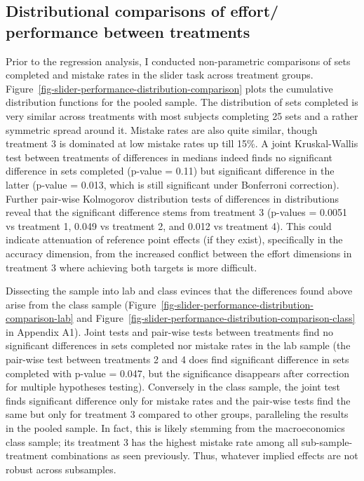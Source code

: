 \documentclass[
  12,
  letterpaper,
  DIV=11,
  numbers=noendperiod]{scrartcl}
\begin{document}
\subsection{Distributional comparisons of effort/ performance between
treatments}\label{distributional-comparisons-of-effort-performance-between-treatments}

Prior to the regression analysis, I conducted non-parametric comparisons
of sets completed and mistake rates in the slider task across treatment
groups. Figure~\ref{fig-slider-performance-distribution-comparison}
plots the cumulative distribution functions for the pooled sample. The
distribution of sets completed is very similar across treatments with
most subjects completing 25 sets and a rather symmetric spread around
it. Mistake rates are also quite similar, though treatment 3 is
dominated at low mistake rates up till 15\%. A joint Kruskal-Wallis test
between treatments of differences in medians indeed finds no significant
difference in sets completed (p-value = 0.11) but significant difference
in the latter (p-value = 0.013, which is still significant under
Bonferroni correction). Further pair-wise Kolmogorov distribution tests
of differences in distributions reveal that the significant difference
stems from treatment 3 (p-values = 0.0051 vs treatment 1, 0.049 vs
treatment 2, and 0.012 vs treatment 4). This could indicate attenuation
of reference point effects (if they exist), specifically in the accuracy
dimension, from the increased conflict between the effort dimensions in
treatment 3 where achieving both targets is more difficult.

Dissecting the sample into lab and class evinces that the differences
found above arise from the class sample
(Figure~\ref{fig-slider-performance-distribution-comparison-lab} and
Figure~\ref{fig-slider-performance-distribution-comparison-class} in
Appendix A1). Joint tests and pair-wise tests between treatments find no
significant differences in sets completed nor mistake rates in the lab
sample (the pair-wise test between treatments 2 and 4 does find
significant difference in sets completed with p-value = 0.047, but the
significance disappears after correction for multiple hypotheses
testing). Conversely in the class sample, the joint test finds
significant difference only for mistake rates and the pair-wise tests
find the same but only for treatment 3 compared to other groups,
paralleling the results in the pooled sample. In fact, this is likely
stemming from the macroeconomics class sample; its treatment 3 has the
highest mistake rate among all sub-sample-treatment combinations as seen
previously. Thus, whatever implied effects are not robust across
subsamples.
\end{document}
